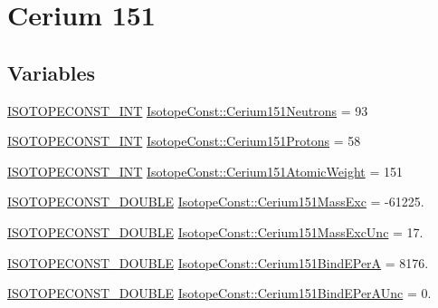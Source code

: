 \hypertarget{group___isotope_const-_cerium-_ce151}{}\section{Cerium 151}
\label{group___isotope_const-_cerium-_ce151}
\subsection*{Variables}
\begin{DoxyCompactItemize}
\item 
\mbox{\hyperlink{group___isotope_const-_macros_ga5f18360b3e99483a35c32d789e62621c}{I\+S\+O\+T\+O\+P\+E\+C\+O\+N\+S\+T\+\_\+\+I\+NT}} \mbox{\hyperlink{group___isotope_const-_cerium-_ce151_gada3da9d6d4c683351ce2db6f16c9f64b}{Isotope\+Const\+::\+Cerium151\+Neutrons}} = 93
\item 
\mbox{\hyperlink{group___isotope_const-_macros_ga5f18360b3e99483a35c32d789e62621c}{I\+S\+O\+T\+O\+P\+E\+C\+O\+N\+S\+T\+\_\+\+I\+NT}} \mbox{\hyperlink{group___isotope_const-_cerium-_ce151_gafa0fe31700263b65b46b717a9552dbb7}{Isotope\+Const\+::\+Cerium151\+Protons}} = 58
\item 
\mbox{\hyperlink{group___isotope_const-_macros_ga5f18360b3e99483a35c32d789e62621c}{I\+S\+O\+T\+O\+P\+E\+C\+O\+N\+S\+T\+\_\+\+I\+NT}} \mbox{\hyperlink{group___isotope_const-_cerium-_ce151_gaa4a4af77a725a97e6335791eb61b7a08}{Isotope\+Const\+::\+Cerium151\+Atomic\+Weight}} = 151
\item 
\mbox{\hyperlink{group___isotope_const-_macros_ga8f45a7272ce02c0b4c65c44636ed719a}{I\+S\+O\+T\+O\+P\+E\+C\+O\+N\+S\+T\+\_\+\+D\+O\+U\+B\+LE}} \mbox{\hyperlink{group___isotope_const-_cerium-_ce151_ga80df22ad62d90eff279ed38a0029d696}{Isotope\+Const\+::\+Cerium151\+Mass\+Exc}} = -\/61225.
\item 
\mbox{\hyperlink{group___isotope_const-_macros_ga8f45a7272ce02c0b4c65c44636ed719a}{I\+S\+O\+T\+O\+P\+E\+C\+O\+N\+S\+T\+\_\+\+D\+O\+U\+B\+LE}} \mbox{\hyperlink{group___isotope_const-_cerium-_ce151_gae88866ecca36c041a066a9d800ece4d6}{Isotope\+Const\+::\+Cerium151\+Mass\+Exc\+Unc}} = 17.
\item 
\mbox{\hyperlink{group___isotope_const-_macros_ga8f45a7272ce02c0b4c65c44636ed719a}{I\+S\+O\+T\+O\+P\+E\+C\+O\+N\+S\+T\+\_\+\+D\+O\+U\+B\+LE}} \mbox{\hyperlink{group___isotope_const-_cerium-_ce151_gace4a82d7b38d946f6e0b028aaa6c7e3c}{Isotope\+Const\+::\+Cerium151\+Bind\+E\+PerA}} = 8176.
\item 
\mbox{\hyperlink{group___isotope_const-_macros_ga8f45a7272ce02c0b4c65c44636ed719a}{I\+S\+O\+T\+O\+P\+E\+C\+O\+N\+S\+T\+\_\+\+D\+O\+U\+B\+LE}} \mbox{\hyperlink{group___isotope_const-_cerium-_ce151_ga331ba09f41755a72d3f4018a04d1c1fd}{Isotope\+Const\+::\+Cerium151\+Bind\+E\+Per\+A\+Unc}} = 0.

\end{DoxyCompactItemize}
